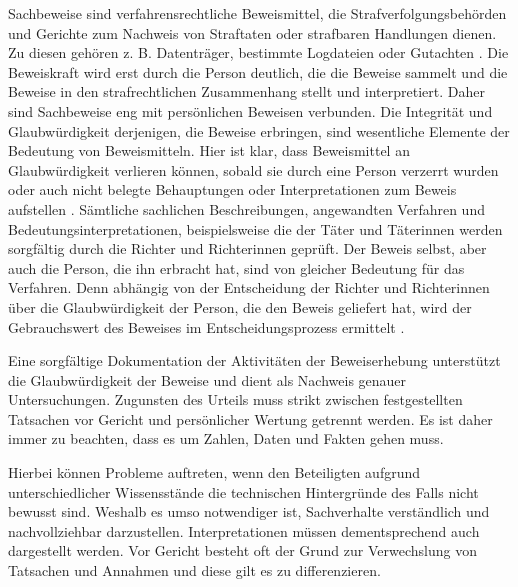 \documentclass[12pt,DIV=14, version=first, BCOR=10mm,a4paper,twoside,parskip=half-,headsepline,headinclude]{scrartcl}
\begin{document}
Sachbeweise sind verfahrensrechtliche Beweismittel, die Strafverfolgungsbehörden und Gerichte zum Nachweis von Straftaten oder strafbaren Handlungen dienen. Zu diesen gehören z. B. Datenträger, bestimmte Logdateien oder Gutachten \cite[vgl. 78]{texbook01}.
Die Beweiskraft wird erst durch die Person deutlich, die die Beweise sammelt und die Beweise in den strafrechtlichen Zusammenhang stellt und interpretiert. Daher sind Sachbeweise eng mit persönlichen Beweisen verbunden. 
Die Integrität und Glaubwürdigkeit derjenigen, die Beweise erbringen, sind wesentliche Elemente der Bedeutung von Beweismitteln.
Hier ist klar, dass Beweismittel an Glaubwürdigkeit verlieren können, sobald sie durch eine Person verzerrt wurden oder auch nicht belegte Behauptungen oder Interpretationen zum Beweis aufstellen \cite[vgl. S. 79]{texbook01}. 
Sämtliche sachlichen Beschreibungen, angewandten Verfahren und Bedeutungsinterpretationen, beispielsweise die der Täter und Täterinnen werden sorgfältig durch die Richter und Richterinnen geprüft. %
Der Beweis selbst, aber auch die Person, die ihn erbracht hat, sind von gleicher Bedeutung für das Verfahren. Denn abhängig von der Entscheidung der Richter und Richterinnen über die Glaubwürdigkeit der Person, die den Beweis geliefert hat, wird der Gebrauchswert des Beweises im Entscheidungsprozess ermittelt \cite[vgl. S. 98]{texbook03}.

Eine sorgfältige Dokumentation der Aktivitäten der Beweiserhebung unterstützt die Glaubwürdigkeit der Beweise und dient als Nachweis genauer Untersuchungen.
Zugunsten des Urteils muss strikt zwischen festgestellten Tatsachen vor Gericht und persönlicher Wertung getrennt werden.
Es ist daher immer zu beachten, dass es um Zahlen, Daten und Fakten gehen muss.

Hierbei können Probleme auftreten, wenn den Beteiligten aufgrund unterschiedlicher Wissensstände die technischen Hintergründe des Falls nicht bewusst sind.
Weshalb es umso notwendiger ist, Sachverhalte verständlich und nachvollziehbar darzustellen.
Interpretationen müssen dementsprechend auch dargestellt werden.
Vor Gericht besteht oft der Grund zur Verwechslung von Tatsachen und Annahmen und diese gilt es zu differenzieren. 
\end{document}
